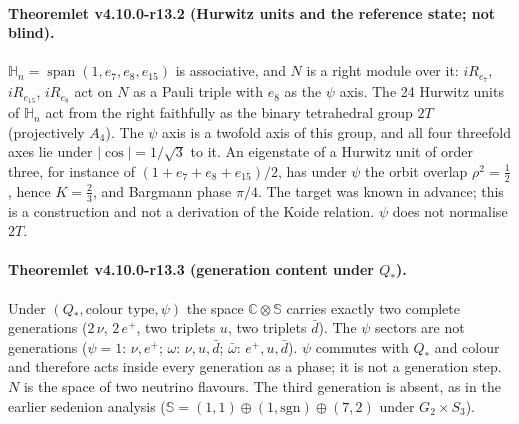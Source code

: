\paragraph{Theoremlet v4.10.0-r13.2 (Hurwitz units and the reference state; not blind).}
\(\mathbb H_n=\operatorname{span}(1,e_7,e_8,e_{15})\) is associative, and \(N\) is a right module over it: \(iR_{e_7}\),
\(iR_{e_{15}}\), \(iR_{e_8}\) act on \(N\) as a Pauli triple with \(e_8\) as the \(\psi\) axis.  The 24 Hurwitz units of
\(\mathbb H_n\) act from the right faithfully as the binary tetrahedral group \(2T\) (projectively \(A_4\)).  The \(\psi\) axis is
a twofold axis of this group, and all four threefold axes lie under \(|\cos|=1/\sqrt3\) to it.  An eigenstate of a Hurwitz
unit of order three, for instance of \((1+e_7+e_8+e_{15})/2\), has under \(\psi\) the orbit overlap \(\rho^2=\tfrac12\), hence
\(K=\tfrac23\), and Bargmann phase \(\pi/4\).  The target was known in advance; this is a construction and not a derivation of
the Koide relation.  \(\psi\) does not normalise \(2T\).

\paragraph{Theoremlet v4.10.0-r13.3 (generation content under \(Q_*\)).}
Under \((Q_*,\text{colour type},\psi)\) the space \(\mathbb C\otimes\mathbb S\) carries exactly two complete generations
(\(2\,\nu\), \(2\,e^+\), two triplets \(u\), two triplets \(\bar d\)).  The \(\psi\) sectors are not generations
(\(\psi=1\): \(\nu,e^+\); \(\omega\): \(\nu,u,\bar d\); \(\bar\omega\): \(e^+,u,\bar d\)).  \(\psi\) commutes with \(Q_*\) and colour
and therefore acts inside every generation as a phase; it is not a generation step.  \(N\) is the space of two neutrino
flavours.  The third generation is absent, as in the earlier sedenion analysis (\(\mathbb S=(1,1)\oplus(1,\mathrm{sgn})\oplus(7,2)\)
under \(G_2\times S_3\)).

